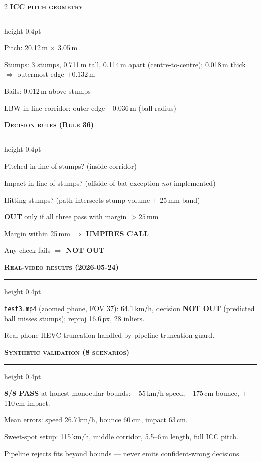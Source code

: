 \documentclass[9pt,a4paper]{extarticle}
\newenvironment{tightitemize}{%
  \begin{list}{\textbullet}{%
    \setlength{\leftmargin}{10pt}%
    \setlength{\labelwidth}{6pt}%
    \setlength{\labelsep}{3pt}%
    \setlength{\itemsep}{0pt}%
    \setlength{\parsep}{0pt}%
    \setlength{\topsep}{1pt}%
    \setlength{\partopsep}{0pt}%
  }%
}{\end{list}}
\renewcommand{\section}[1]{%
  \vspace{3pt}%
  {\color{amber}\bfseries\scshape\normalsize #1}\par
  \vspace{1pt}%
  \hrule height 0.4pt\relax
  \vspace{2pt}%
}
\begin{document}
\begin{multicols}{2}
\section{ICC pitch geometry}
\begin{tightitemize}
\item Pitch: 20.12\,m $\times$ 3.05\,m
\item Stumps: 3 stumps, 0.711\,m tall, 0.114\,m apart (centre-to-centre); 0.018\,m thick $\Rightarrow$ outermost edge $\pm 0.132$\,m
\item Bails: 0.012\,m above stumps
\item LBW in-line corridor: outer edge $\pm 0.036$\,m (ball radius)
\end{tightitemize}

\section{Decision rules (Rule 36)}
\begin{tightitemize}
\item Pitched in line of stumps? (inside corridor)
\item Impact in line of stumps? (offside-of-bat exception \emph{not} implemented)
\item Hitting stumps? (path intersects stump volume + 25\,mm band)
\item \textbf{OUT} only if all three pass with margin $> 25$\,mm
\item Margin within 25\,mm $\Rightarrow$ \textbf{UMPIRES CALL}
\item Any check fails $\Rightarrow$ \textbf{NOT OUT}
\end{tightitemize}

\section{Real-video results (2026-05-24)}
\begin{tightitemize}
\item \texttt{test3.mp4} (zoomed phone, FOV 37\textdegree): 64.1\,km/h, decision \textbf{NOT OUT} (predicted ball misses stumps); reproj 16.6\,px, 28 inliers.
\item Real-phone HEVC truncation handled by pipeline truncation guard.
\end{tightitemize}

\section{Synthetic validation (8 scenarios)}
\begin{tightitemize}
\item \textbf{8/8 PASS} at honest monocular bounds: $\pm$55\,km/h speed, $\pm$175\,cm bounce, $\pm$110\,cm impact.
\item Mean errors: speed 26.7\,km/h, bounce 60\,cm, impact 63\,cm.
\item Sweet-spot setup: 115\,km/h, middle corridor, 5.5--6\,m length, full ICC pitch.
\item Pipeline rejects fits beyond bounds --- never emits confident-wrong decisions.
\end{tightitemize}


\end{multicols}
\end{document}
